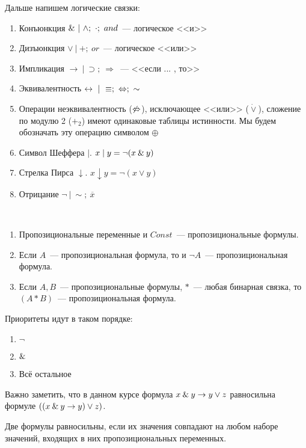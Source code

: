 \documentclass[main]{subfiles}
\begin{document}
Дальше напишем логические связки:
\begin{enumerate}
    \item Конъюнкция $\and\ |\ \land;\ \cdot;\ and $~--- логическое <<и>>
    \item Дизъюнкция $\lor\ |\ +;\ or$~---  логическое <<или>>
    \item Импликация $\to\ |\ \supset;\ \Rightarrow$~--- <<если ... , то>>
    \item Эквивалентность $\leftrightarrow\ |\ \equiv;\ \lra;\ \sim$
    \item Операции неэквивалентность ($\not\Leftrightarrow$), исключающее <<или>> ($\dot{\lor}$), сложение по модулю 2 ($+_2$) имеют одинаковые таблицы истинности. Мы будем обозначать эту операцию символом $\oplus$
    \item Символ Шеффера $ \mid$.   $x\mid y = \lnot(x\mathbin{\&} y)$
    \item Стрелка Пирса $\downarrow$.   $x\downarrow y = \lnot(x\lor y)$
    \item Отрицание $\lnot\ |\ \sim;\ \overline{x}$
\end{enumerate}
\begin{definition}
    \

    \begin{enumerate}
        \item Пропозициональные переменные и $Const$~--- пропозициональные формулы.
        \item Если $A$~--- пропозициональная формула, то и $\lnot A$~--- пропозициональная формула.
        \item Если $A, B$~--- пропозициональные формулы, $*$~--- любая бинарная связка, то $(A * B)$~--- пропозициональная формула.
    \end{enumerate}
\end{definition}
Приоритеты идут в таком порядке:
\begin{enumerate}
    \item $\lnot$
    \item $\mathbin{\&}$
    \item Всё остальное
\end{enumerate}
\begin{remark}
    Важно заметить, что в данном курсе формула $x\mathbin{\&} y \to y\lor z$ равносильна формуле $((x\mathbin{\&} y \to y) \lor z)$.
\end{remark}
\begin{definition}
    Две формулы равносильны, если их значения совпадают на любом наборе значений, входящих в них пропозициональных переменных.
\end{definition}
\end{document}
